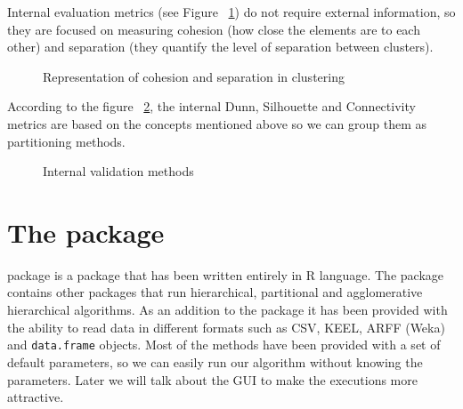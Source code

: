 Internal evaluation metrics (see Figure ~\ref{fig:cohesion}) do not require external information, so they are focused on measuring cohesion (how close the elements are to each other) and separation (they quantify the level of separation between clusters).

\begin{figure}[htbp]
  \centering
    \caption{Representation of cohesion and separation in clustering \cite{b54}}%
    \label{fig:cohesion}%
\end{figure}

According to the figure ~\ref{fig:internal}, the internal Dunn, Silhouette and Connectivity metrics are based on the concepts mentioned above so we can group them as partitioning methods.

\begin{figure}[htbp]
  \centering
    \caption{Internal validation methods \cite{b54}}%
    \label{fig:internal}%
\end{figure}

\section{The  package}\label{sec:clusteringpackage}

 package is a package that has been written entirely in R language. The package contains other  packages that run hierarchical, partitional and agglomerative hierarchical algorithms. As an addition to the package it has been provided with the ability to read data in different formats such as CSV, KEEL, ARFF (Weka) and \texttt{data.frame} objects. Most of the methods have been provided with a set of default parameters, so we can easily run our algorithm without knowing the parameters. Later we will talk about the GUI to make the executions more attractive.

